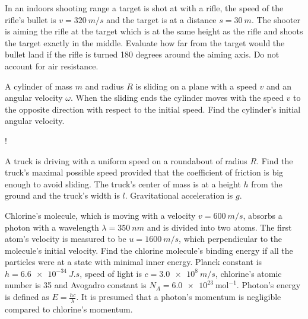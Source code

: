 \documentclass[11pt]{article}
\begin{document}

\probeng
In an indoors shooting range a target is shot at with a rifle, the speed of the rifle’s bullet is $v=\SI{320}{m/s}$ and the target is at a distance $s=\SI{30}{m}$. The shooter is aiming the rifle at the target which is at the same height as the rifle and shoots the target exactly in the middle. Evaluate how far from the target would the bullet land if the rifle is turned 180 degrees around the aiming axis. Do not account for air resistance.
\probend
\bigskip


\probeng
A cylinder of mass $m$ and radius $R$ is sliding on a plane with a speed $v$ and an angular velocity $\omega$. When the sliding ends the cylinder moves with the speed $v$ to the opposite direction with respect to the initial speed. Find the cylinder’s initial angular velocity.
\begin{center}
	\begin{resizebox}{0.35\linewidth}{!}{
			}
	\end{resizebox}
\end{center}
\probend
\bigskip


\probeng
A truck is driving with a uniform speed on a roundabout of radius $R$. Find the truck’s maximal possible speed provided that the coefficient of friction is big enough to avoid sliding. The truck’s center of mass is at a height $h$ from the ground and the truck’s width is $l$. Gravitational acceleration is $g$.
\probend
\bigskip


\probeng
Chlorine’s molecule, which is moving with a velocity $v = \SI{600}{m/s}$, absorbs a photon with a wavelength $\lambda = \SI{350}{nm}$ and is divided into two atoms. The first atom’s velocity is measured to be $ u = \SI{1600}{m/s}$, which perpendicular to the molecule’s initial velocity. Find the chlorine molecule’s binding energy if all the particles were at a state with minimal inner energy. Planck constant is $h =
\SI{6,6e-34}{J.s}$, speed of light is $c = \SI{3,0e8}{m/s}$, chlorine’s atomic number is 35 and Avogadro constant is $N_A
= \SI{6,0e23}{\text{mol}^{-1}}$. Photon’s energy is defined as $E =
\frac{h c}{\lambda}$. It is presumed that a photon’s momentum is negligible compared to chlorine’s momentum.
\probend
\bigskip
\end{document}
